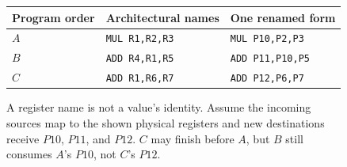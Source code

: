 \begin{figure}[htbp]
  \centering
  \begin{tabular}{lll}
    \toprule
    Program order & Architectural names & One renamed form \\
    \midrule
    $A$ & \texttt{MUL R1,R2,R3} & \texttt{MUL P10,P2,P3} \\
    $B$ & \texttt{ADD R4,R1,R5} & \texttt{ADD P11,P10,P5} \\
    $C$ & \texttt{ADD R1,R6,R7} & \texttt{ADD P12,P6,P7} \\
    \bottomrule
  \end{tabular}
  \par\medskip
  \caption{A register name is not a value's identity. Assume the incoming sources map to the shown physical registers and new destinations receive $P10$, $P11$, and $P12$. $C$ may finish before $A$, but $B$ still consumes $A$'s $P10$, not $C$'s $P12$.}
  \label{fig:register-versions}
\end{figure}
